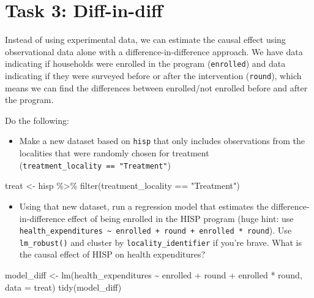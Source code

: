 \documentclass[
  letterpaper,
  DIV=11,
  numbers=noendperiod]{scrartcl}
\newenvironment{Shaded}{\begin{snugshade}}{\end{snugshade}}
\newcommand{\AttributeTok}[1]{\textcolor[rgb]{0.40,0.45,0.13}{#1}}
\newcommand{\FunctionTok}[1]{\textcolor[rgb]{0.28,0.35,0.67}{#1}}
\newcommand{\NormalTok}[1]{\textcolor[rgb]{0.00,0.23,0.31}{#1}}
\newcommand{\OtherTok}[1]{\textcolor[rgb]{0.00,0.23,0.31}{#1}}
\newcommand{\SpecialCharTok}[1]{\textcolor[rgb]{0.37,0.37,0.37}{#1}}
\newcommand{\StringTok}[1]{\textcolor[rgb]{0.13,0.47,0.30}{#1}}
\providecommand{\tightlist}{%
  \setlength{\itemsep}{0pt}\setlength{\parskip}{0pt}}\usepackage{longtable,booktabs,array}
\begin{document}
\newpage

\hypertarget{task-3-diff-in-diff}{%
\section{Task 3: Diff-in-diff}\label{task-3-diff-in-diff}}

Instead of using experimental data, we can estimate the causal effect
using observational data alone with a difference-in-difference approach.
We have data indicating if households were enrolled in the program
(\texttt{enrolled}) and data indicating if they were surveyed before or
after the intervention (\texttt{round}), which means we can find the
differences between enrolled/not enrolled before and after the program.

Do the following:

\begin{itemize}
\tightlist
\item
  Make a new dataset based on \texttt{hisp} that only includes
  observations from the localities that were randomly chosen for
  treatment (\texttt{treatment\_locality\ ==\ "Treatment"})
\end{itemize}

\begin{Shaded}
\begin{Highlighting}[numbers=left,,]
\NormalTok{treat }\OtherTok{\textless{}{-}}\NormalTok{ hisp }\SpecialCharTok{\%\textgreater{}\%} 
  \FunctionTok{filter}\NormalTok{(treatment\_locality }\SpecialCharTok{==} \StringTok{"Treatment"}\NormalTok{)}
\end{Highlighting}
\end{Shaded}

\begin{itemize}
\tightlist
\item
  Using that new dataset, run a regression model that estimates the
  difference-in-difference effect of being enrolled in the HISP program
  (huge hint: use
  \texttt{health\_expenditures\ \textasciitilde{}\ enrolled\ +\ round\ +\ enrolled\ *\ round}).
  Use \texttt{lm\_robust()} and cluster by \texttt{locality\_identifier}
  if you're brave. What is the causal effect of HISP on health
  expenditures?
\end{itemize}

\begin{Shaded}
\begin{Highlighting}[numbers=left,,]
\NormalTok{model\_diff }\OtherTok{\textless{}{-}} \FunctionTok{lm}\NormalTok{(health\_expenditures }\SpecialCharTok{\textasciitilde{}}\NormalTok{ enrolled }\SpecialCharTok{+}\NormalTok{ round }\SpecialCharTok{+}\NormalTok{ enrolled }\SpecialCharTok{*}\NormalTok{ round,}
                 \AttributeTok{data =}\NormalTok{ treat)}
\FunctionTok{tidy}\NormalTok{(model\_diff)}
\end{Highlighting}
\end{Shaded}
\end{document}
